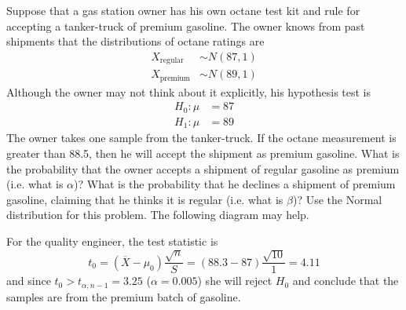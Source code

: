 Suppose that a gas station owner has his own octane test
kit and rule for accepting a tanker-truck of premium gasoline.
The owner knows from past shipments that the distributions
of octane ratings are
\begin{align*}
X_{\text{regular}} &\sim N(87,1) \\
X_{\text{premium}} &\sim N(89,1)
\end{align*}
Although the owner may not think about it explicitly, his hypothesis
test is
\begin{align*}
H_0: \mu &= 87 \\
H_1: \mu &= 89
\end{align*}
The owner takes one sample from the tanker-truck. If the octane
measurement is greater than 88.5, then he will accept the shipment as
premium gasoline. What is the probability that the owner accepts a
shipment of regular gasoline as premium (i.e. what is $\alpha$)? What
is the probability that he declines a shipment of premium gasoline,
claiming that he thinks it is regular (i.e. what is $\beta$)?  Use the
Normal distribution for this problem. The following diagram may help.


For the quality engineer, the test statistic is
\[
t_0 = \left( \overline{X} - \mu_0 \right)\frac{\sqrt{n}}{S} 
= \left(88.3 - 87\right) \frac{\sqrt{10}}{1} 
 = 4.11
\]
and since $t_0 > t_{\alpha,n-1}=3.25$ ($\alpha=0.005$) she will
reject $H_0$ and conclude that the samples are from the premium
batch of gasoline.


